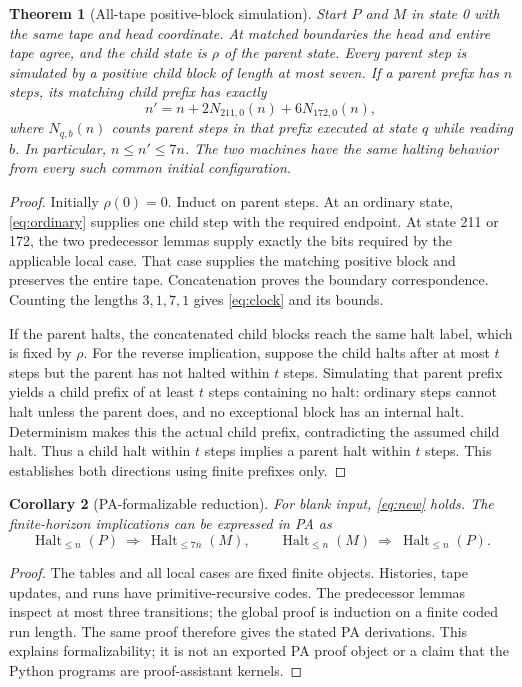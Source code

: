\documentclass[11pt,letterpaper]{article}
\newcommand{\Halt}{\operatorname{Halt}}
\newtheorem{theorem}{Theorem}[section]
\newtheorem{corollary}[theorem]{Corollary}
\begin{document}
\begin{theorem}[All-tape positive-block simulation]\label{thm:fold}
Start $P$ and $M$ in state 0 with the same tape and head coordinate. At
matched boundaries the head and entire tape agree, and the child state is
$\rho$ of the parent state. Every parent step is simulated by a positive
child block of length at most seven. If a parent prefix has $n$ steps, its
matching child prefix has exactly
\begin{equation}\label{eq:clock}
 n'=n+2N_{211,0}(n)+6N_{172,0}(n),
\end{equation}
where $N_{q,b}(n)$ counts parent steps in that prefix executed at state $q$
while reading $b$. In particular, $n\le n'\le7n$. The two machines have the
same halting behavior from every such common initial configuration.
\end{theorem}
\begin{proof}
Initially $\rho(0)=0$. Induct on parent steps. At an ordinary state,
\eqref{eq:ordinary} supplies one child step with the required endpoint.
At state 211 or 172, the two predecessor lemmas supply exactly the bits
required by the applicable local case. That case supplies the matching
positive block and preserves the entire tape. Concatenation proves the
boundary correspondence. Counting the lengths $3,1,7,1$ gives
\eqref{eq:clock} and its bounds.

If the parent halts, the concatenated child blocks reach the same halt
label, which is fixed by $\rho$. For the reverse implication, suppose the
child halts after at most $t$ steps but the parent has not halted within
$t$ steps. Simulating that parent prefix yields a child prefix of at least
$t$ steps containing no halt: ordinary steps cannot halt unless the parent
does, and no exceptional block has an internal halt. Determinism makes
this the actual child prefix, contradicting the assumed child halt.
Thus a child halt within $t$ steps implies a parent halt within $t$ steps.
This establishes both directions using finite prefixes only.
\end{proof}

\begin{corollary}[PA-formalizable reduction]
For blank input, \eqref{eq:new} holds. The finite-horizon implications can
be expressed in PA as
\[
 \Halt_{\le n}(P)\ \Longrightarrow\ \Halt_{\le7n}(M),
 \qquad
 \Halt_{\le n}(M)\ \Longrightarrow\ \Halt_{\le n}(P).
\]
\end{corollary}
\begin{proof}
The tables and all local cases are fixed finite objects. Histories, tape
updates, and runs have primitive-recursive codes. The predecessor lemmas
inspect at most three transitions; the global proof is induction on a
finite coded run length. The same proof therefore gives the stated PA
derivations. This explains formalizability; it is not an exported PA proof
object or a claim that the Python programs are proof-assistant kernels.
\end{proof}
\end{document}
